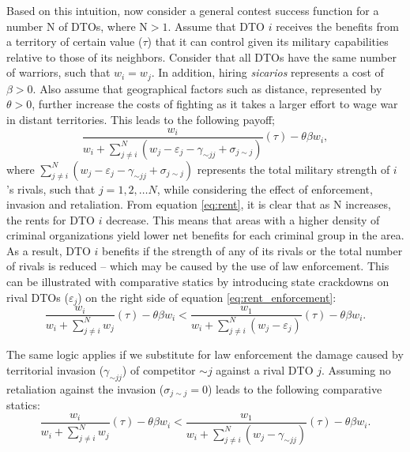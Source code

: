 \documentclass[12pt,letterpaper]{article}
\newcommand{\N}{\mathrm{N}}
\begin{document}
Based on this intuition, now consider a general contest success function for a number $\N$ of DTOs, where $\N >1$. Assume that DTO $i$ receives the benefits from a territory of certain value ($\tau$) that it can control given its military capabilities relative to those of its neighbors. Consider that all DTOs have the same number of warriors, such that $w_{i}=w_{j}$. In addition, hiring \emph{sicarios} represents a cost of $\beta>0$. Also assume that geographical factors such as distance, represented by $\theta>0$, further increase the costs of fighting as it takes a larger effort to wage war in distant territories. This leads to the following payoff;
\begin{equation}
\frac{w_{i}}{w_{i}+\sum^{N}_{j\neq i}(w_{j} - \varepsilon_{j} -\gamma_{\sim j j} +\sigma_{j \sim j})}(\tau)-\theta\beta w_{i},
\label{eq:rent}
\end{equation}
where $\sum^{N}_{j\neq i}(w_{j} - \varepsilon_{j} -\gamma_{\sim j j} +\sigma_{j \sim j})$ represents the total military strength of $i$'s rivals, such that $j=1, 2, \dots N$, while considering the effect of enforcement, invasion and retaliation. From equation \eqref{eq:rent}, it is clear that as $\N$ increases, the rents for DTO $i$ decrease. This means that areas with a higher density of criminal organizations yield lower net benefits for each criminal group in the area. As a result, DTO $i$ benefits if the strength of any of its rivals or the total number of rivals is reduced -- which may be caused by the use of law enforcement. This can be illustrated with comparative statics by introducing state crackdowns on rival DTOs ($\varepsilon_{j}$) on the right side of equation \eqref{eq:rent_enforcement}:
\begin{equation}
\frac{w_{i}}{w_{i}+\sum^{N}_{j\neq i}w_{j}}(\tau)-\theta\beta w_{i} < \frac{w_{1}}{w_{i}+\sum^{N}_{j\neq i}(w_{j}-\varepsilon_{j})}(\tau)-\theta\beta w_{i}.
\label{eq:rent_enforcement}
\end{equation}

The same logic applies if we substitute for law enforcement the damage caused by territorial invasion ($\gamma_{\sim j j}$) of competitor $ \sim j$ against a rival DTO $j$. Assuming no retaliation against the invasion ($\sigma_{j\sim j}=0$) leads to the following comparative statics:
\begin{equation}
\frac{w_{i}}{w_{i}+\sum^{N}_{j\neq i}w_{j}}(\tau)-\theta\beta w_{i} < \frac{w_{1}}{w_{i}+\sum^{N}_{j\neq i}(w_{j}-\gamma_{\sim jj})}(\tau)-\theta\beta w_{i}.
\label{eq:rent_invasion}
\end{equation}
\end{document}

